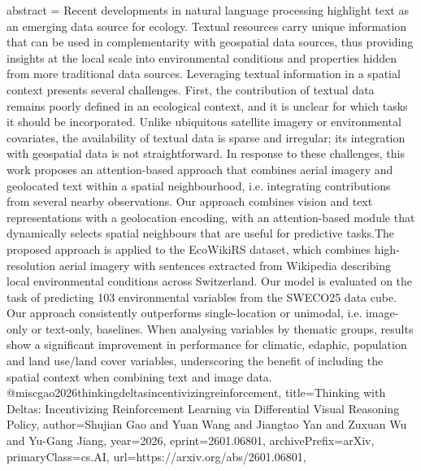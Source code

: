 {      abstract = {Recent developments in natural language processing highlight text as an emerging data source for ecology. Textual resources carry unique information that can be used in complementarity with geospatial data sources, thus providing insights at the local scale into environmental conditions and properties hidden from more traditional data sources. Leveraging textual information in a spatial context presents several challenges. First, the contribution of textual data remains poorly defined in an ecological context, and it is unclear for which tasks it should be incorporated. Unlike ubiquitous satellite imagery or environmental covariates, the availability of textual data is sparse and irregular; its integration with geospatial data is not straightforward. In response to these challenges, this work proposes an attention-based approach that combines aerial imagery and geolocated text within a spatial neighbourhood, i.e. integrating contributions from several nearby observations. Our approach combines vision and text representations with a geolocation encoding, with an attention-based module that dynamically selects spatial neighbours that are useful for predictive tasks.The proposed approach is applied to the EcoWikiRS dataset, which combines high-resolution aerial imagery with sentences extracted from Wikipedia describing local environmental conditions across Switzerland. Our model is evaluated on the task of predicting 103 environmental variables from the SWECO25 data cube. Our approach consistently outperforms single-location or unimodal, i.e. image-only or text-only, baselines. When analysing variables by thematic groups, results show a significant improvement in performance for climatic, edaphic, population and land use/land cover variables, underscoring the benefit of including the spatial context when combining text and image data.}
}@misc{gao2026thinkingdeltasincentivizingreinforcement,
      title={Thinking with Deltas: Incentivizing Reinforcement Learning via Differential Visual Reasoning Policy}, 
      author={Shujian Gao and Yuan Wang and Jiangtao Yan and Zuxuan Wu and Yu-Gang Jiang},
      year={2026},
      eprint={2601.06801},
      archivePrefix={arXiv},
      primaryClass={cs.AI},
      url={https://arxiv.org/abs/2601.06801},
}

